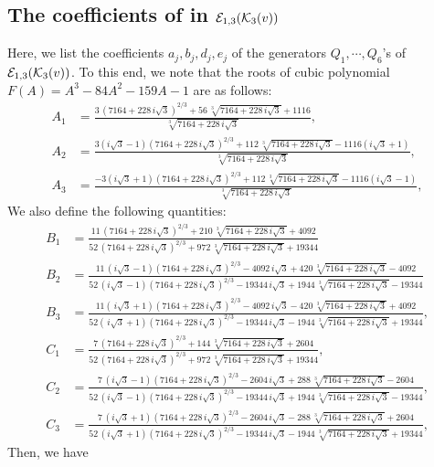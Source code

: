 \documentclass[11pt]{amsart}
\begin{document}

\subsection{The coefficients of   in ${\mathcal E}_{1,3}({\mathcal K}_3(v))$}
\label{a1-3}
Here, we list the coefficients $a_j, b_j, d_j, e_j$ of the  generators
$Q_1, \cdots, Q_6$'s of ${\mathcal E}_{1,3}({\mathcal K}_3 (v))$. To this end, we note that the roots of 
cubic polynomial $F(A)=A^3-84 A^2 - 159 A-1$  are as follows:
\begin{align*}
	A_1& ={\frac {3\, \left( 7164+228\,i\sqrt {3} \right) ^{2/3}+56\,\sqrt [3]{
				7164+228\,i\sqrt {3}}+1116}{\sqrt [3]{7164+228\,i\sqrt {3}}}},\\
	A_2& = {\frac {3 (i \sqrt {3}-1) \left( 7164+228\,i\sqrt {3} \right) ^{2/3}
			+112\,	\sqrt [3]{7164+228\,i\sqrt {3}}-1116(i\sqrt {3} +1)}{\sqrt [3]{7164+228\,i\sqrt {3}}}},\\
	A_3&= {\frac {-3 (i \sqrt {3}+1) \left( 7164+228\,i\sqrt {3} \right) ^{2/3}
			+112\,	\sqrt [3]{7164+228\,i\sqrt {3}}-1116(i\sqrt {3} -1)}{\sqrt [3]{7164+228\,i\sqrt {3}}}},
\end{align*}
We also define the following quantities:	
\begin{align*}
	B_1& = \frac{ 11\, \left( 7164+228\,i\sqrt {3} \right) ^{2/3}+210\,	\sqrt [3]{7164+228\,i\sqrt {3}}+4092  }
	{ 52\, \left( 7164+228\,i\sqrt {3} \right)^{2/3}+972\,	\sqrt [3]{7164+228\,i\sqrt {3}}+19344 } \\ 
	B_2 & =	{\frac {11\, \left( i\sqrt {3}-1 \right)  \left( 7164+228\,i\sqrt {3}
			\right) ^{2/3}-4092\,i\sqrt {3}+420\,\sqrt [3]{7164+228\,i\sqrt {3}}-
			4092}{52\, \left( i\sqrt {3}-1 \right)  \left( 7164+228\,i\sqrt {3}
			\right) ^{2/3}-19344\,i\sqrt {3}+1944\,\sqrt [3]{7164+228\,i\sqrt {3}
			}-19344}}\\
	B_3 & = \frac{ 11 \left(\,i\sqrt {3}+1 \right)  \left( 7164+228\,i\sqrt {3}
		\right) ^{2/3}-4092\,i\sqrt {3}-420\,\sqrt [3]{7164+228\,i\sqrt {3}}+
		4092}{ 52	\left( \,i\sqrt {3}+1 \right)  \left( 7164+228\,i\sqrt {3}
		\right) ^{2/3}-19344\,i\sqrt {3}-1944\,\sqrt [3]{7164+228\,i\sqrt {3}
		}+19344},\\
	C_1&  ={\frac {7\, \left( 7164+228\,i\sqrt {3} \right) ^{2/3}+144\,\sqrt [3]{
				7164+228\,i\sqrt {3}}+2604}{52\, \left( 7164+228\,i\sqrt {3} \right) ^
			{2/3}+972\,\sqrt [3]{7164+228\,i\sqrt {3}}+19344}},\\
	C_2& = {\frac {7\, \left( i\sqrt {3}-1 \right)  \left( 7164+228\,i\sqrt {3}
			\right) ^{2/3}-2604\,i\sqrt {3}+288\,\sqrt [3]{7164+228\,i\sqrt {3}}-
			2604}{52\, \left( i\sqrt {3}-1 \right)  \left( 7164+228\,i\sqrt {3}
			\right) ^{2/3}-19344\,i\sqrt {3}+1944\,\sqrt [3]{7164+228\,i\sqrt {3}
			}-19344}},\\
	C_3& = {\frac {7\, \left( i\sqrt {3}+1 \right)  \left( 7164+228\,i\sqrt {3}
			\right) ^{2/3}-2604\,i\sqrt {3}-288\,\sqrt [3]{7164+228\,i\sqrt {3}}+
			2604}{52\, \left( i\sqrt {3}+1 \right)  \left( 7164+228\,i\sqrt {3}
			\right) ^{2/3}-19344\,i\sqrt {3}-1944\,\sqrt [3]{7164+228\,i\sqrt {3}
			}+19344}},
\end{align*}
Then, we have 
\end{document}
